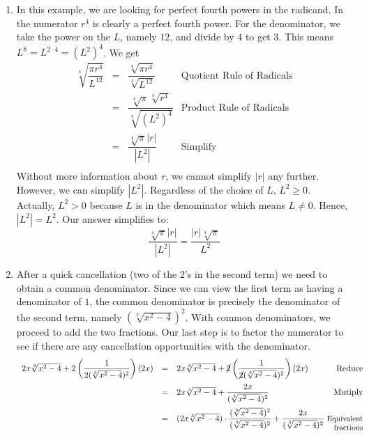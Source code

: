 \begin{ex}
\begin{enumerate}
\item  In this example, we are looking for perfect fourth powers in the radicand.  In the numerator $r^4$ is clearly a perfect fourth power.  For the denominator, we take the power on the $L$, namely $12$, and divide by $4$ to get $3$.  This means $L^{8} = L^{2\cdot 4} = (L^2)^{4}$.  We get \[ \begin{array}{rclr}

\sqrt[4]{\dfrac{\pi r^{4}}{L^{12}}} & = & \dfrac{\sqrt[4]{\pi r^{4}}}{\sqrt[4]{L^{12}}} & \text{Quotient Rule of Radicals} \\ [12pt]

                                    & = & \dfrac{\sqrt[4]{\pi}\sqrt[4]{r^{4}}}{\sqrt[4]{(L^2)^{4}}} & \text{Product Rule of Radicals} \\ [12pt]
																		& = & \dfrac{\sqrt[4]{\pi}|r|}{|L^2|} & \text{Simplify} \\
																	
\end{array}\]  Without more information about $r$, we cannot simplify $|r|$ any further.  However, we can simplify $|L^2|$.  Regardless of the choice of $L$, $L^2 \geq 0$. Actually, $L^2 > 0$ because $L$ is in the denominator which means $L \neq 0$. Hence, $|L^2| = L^2$.  Our answer simplifies to: \[ \dfrac{\sqrt[4]{\pi}|r|}{|L^2|} = \dfrac{|r|\sqrt[4]{\pi}}{L^2} \]

\item After a quick cancellation (two of the $2$'s in the second term) we need to obtain a common denominator.  Since we can view the first term as having a denominator of $1$,  the common denominator is precisely the denominator of the second term, namely $(\sqrt[3]{x^2-4})^2$.  With common denominators, we proceed to add the two fractions.  Our last step is to factor the numerator to see if there are any cancellation opportunities with the denominator.\[ \begin{array}{rclr}

2x \sqrt[3]{x^2-4} + 2\left(\dfrac{1}{2(\sqrt[3]{x^2-4})^2}\right)  (2x) & = & 2x \sqrt[3]{x^2-4} + \cancel{2}\left(\dfrac{1}{\cancel{2}(\sqrt[3]{x^2-4})^2}\right)  (2x) & \text{Reduce}\\ [12pt]

& = & 2x \sqrt[3]{x^2-4} + \dfrac{2x}{(\sqrt[3]{x^2-4})^2} & \text{Mutiply} \\[12pt]

& = & (2x \sqrt[3]{x^2-4}) \cdot \dfrac{(\sqrt[3]{x^2-4})^2}{(\sqrt[3]{x^2-4})^2} + \dfrac{2x}{(\sqrt[3]{x^2-4})^2} & \hspace*{-.1in}\text{\small Equivalent} \\ [-8pt]
&   &                                                                                                               & \text{\small fractions} \\


\end{array}\]
\end{enumerate}
\end{ex}
